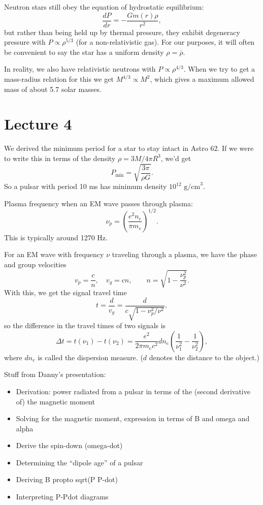 \documentclass[../a122main.tex]{subfiles}
\begin{document}
Neutron stars still obey the equation of hydrostatic equilibrium:
\[ \frac{dP}{dr} = -\frac{G m(r) \rho}{r^2}, \]
but rather than being held up by thermal pressure, they exhibit degeneracy pressure with $P \propto \rho^{5 / 3}$ (for a non-relativistic gas).
For our purposes, it will often be convenient to say the star has a uniform density $\rho = \overline \rho$.

In reality, we also have relativistic neutrons with $P \propto \rho^{4 / 3}$.
When we try to get a mass-radius relation for this we get $M^{4 / 3} \propto M^2$, which gives a maximum allowed mass of about 5.7 solar masses.

\section{Lecture 4}
We derived the minimum period for a star to stay intact in Astro 62.
If we were to write this in terms of the density $\rho = 3M / 4\pi R^3$, we'd get
\[ P_\textrm{min} = \sqrt{\frac{3\pi}{\rho G}}. \]
So a pulsar with period 10 ms has minimum density $10^{12} \textrm{ g/cm}^3$.

Plasma frequency when an EM wave passes through plasma:
\[ \nu_p = \left( \frac{e^2 n_e}{\pi m_e} \right)^{1 / 2}. \]
This is typically around 1270 Hz.

For an EM wave with frequency $\nu$ traveling through a plasma, we have the phase and group velocities
\[ v_p = \frac{c}{n}, \quad v_g = cn, \qquad n = \sqrt{1 - \frac{\nu_p^2}{\nu^2}}. \]
With this, we get the signal travel time
\[ t = \frac{d}{v_g} = \frac{d}{c \sqrt{1 - \nu_p^2 / \nu^2}}, \]
so the difference in the travel times of two signals is
\[ \Delta t = t(\nu_1) - t(\nu_2) = \frac{e^2}{2 \pi m_e c^2} dn_e \left( \frac{1}{\nu_1^2} - \frac{1}{\nu_2^2} \right), \]
where $dn_e$ is called the dispersion measure.
($d$ denotes the distance to the object.)

Stuff from Danny's presentation:
\begin{itemize}[topsep=0pt]
    \item Derivation: power radiated from a pulsar in terms of the (second derivative of) the magnetic moment
    \item Solving for the magnetic moment, expression in terms of B and omega and alpha
    \item Derive the spin-down (omega-dot)
    \item Determining the ``dipole age'' of a pulsar
    \item Deriving B propto sqrt(P P-dot)
    \item Interpreting P-Pdot diagrams
\end{itemize}
\end{document}
